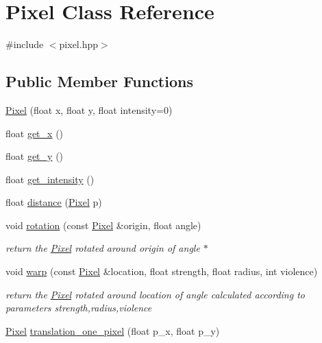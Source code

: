 \hypertarget{class_pixel}{}\section{Pixel Class Reference}
\label{class_pixel}


{\ttfamily \#include $<$pixel.\+hpp$>$}

\subsection*{Public Member Functions}
\begin{DoxyCompactItemize}
\item 
\hyperlink{class_pixel_a2b002814b07e6d2679dfe3dbbe6b6bb2}{Pixel} (float x, float y, float intensity=0)
\item 
float \hyperlink{class_pixel_abfcc199906820cbdd1fb4c833db4084b}{get\+\_\+x} ()
\item 
float \hyperlink{class_pixel_a477538b4154f2d6986e54bae001e3655}{get\+\_\+y} ()
\item 
float \hyperlink{class_pixel_aa7897039a0142fd49e3c71402f708031}{get\+\_\+intensity} ()
\item 
float \hyperlink{class_pixel_afa4a51cc8da3bbc494978266b17facdb}{distance} (\hyperlink{class_pixel}{Pixel} p)
\item 
void \hyperlink{class_pixel_a1909b90317d44b2e24e4f20fde94509a}{rotation} (const \hyperlink{class_pixel}{Pixel} \&origin, float angle)
\begin{DoxyCompactList}\small\item\em return the \hyperlink{class_pixel}{Pixel} rotated around origin of angle $\ast$ \end{DoxyCompactList}\item 
void \hyperlink{class_pixel_ac47147cbdbdc49b4c5ffc32cb11a3ce7}{warp} (const \hyperlink{class_pixel}{Pixel} \&location, float strength, float radius, int violence)
\begin{DoxyCompactList}\small\item\em return the \hyperlink{class_pixel}{Pixel} rotated around location of angle calculated according to parameters strength,radius,violence \end{DoxyCompactList}\item 
\hyperlink{class_pixel}{Pixel} \hyperlink{class_pixel_aede90013c4a336131bd26e1a10b62aae}{translation\+\_\+one\+\_\+pixel} (float p\+\_\+x, float p\+\_\+y)
\end{DoxyCompactItemize}


